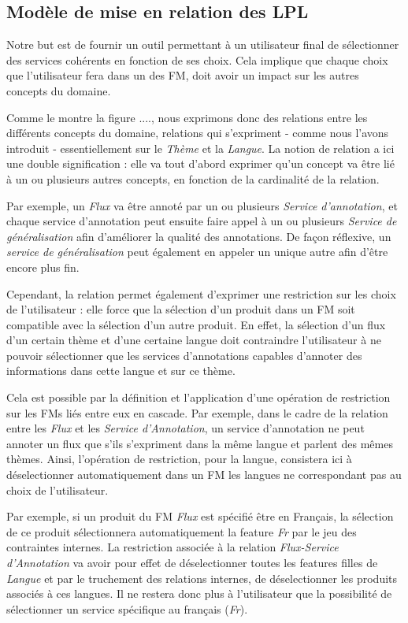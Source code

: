 \documentclass[]{easychair}
\begin{document}
\subsection{Modèle de mise en relation des LPL}
Notre but est de fournir un outil permettant à un utilisateur final de sélectionner des services cohérents en fonction de ses choix. Cela implique que chaque choix que l'utilisateur fera dans un des FM, doit avoir un impact sur les autres concepts du domaine. 

Comme le montre la figure ...., nous exprimons donc des relations entre les différents concepts du domaine, relations qui s'expriment - comme nous l'avons introduit - essentiellement sur le \textit{Thème} et la \textit{Langue}. La notion de relation a ici une double signification : elle va tout d'abord exprimer qu'un concept va être lié à un ou plusieurs autres concepts, en fonction de la cardinalité de la relation.

Par exemple, un \textit{Flux} va être annoté par un ou plusieurs \textit{Service d'annotation}, et chaque service d'annotation peut ensuite faire appel à un ou plusieurs \textit{Service de généralisation} afin d'améliorer la qualité des annotations. De façon réflexive, un \textit{service de généralisation} peut également en appeler un unique autre afin d'être encore plus fin.

Cependant, la relation permet également d'exprimer une restriction sur les choix de l'utilisateur : elle force que la sélection d'un produit dans un FM soit compatible avec la sélection d'un autre produit. En effet, la sélection d'un flux d'un certain thème et d'une certaine langue doit contraindre l'utilisateur à ne pouvoir sélectionner que les services d'annotations capables d'annoter des informations dans cette langue et sur ce thème. 

Cela est possible par la définition et l'application d'une opération de restriction sur les FMs liés entre eux en cascade. Par exemple, dans le cadre de la relation entre les \textit{Flux} et les \textit{Service d'Annotation}, un service d'annotation ne peut annoter un flux que s'ils s'expriment dans la même langue et parlent des mêmes thèmes. Ainsi, l'opération de restriction, pour la langue, consistera ici à déselectionner automatiquement dans un FM les langues ne correspondant pas au choix de l'utilisateur. 

Par exemple, si un produit du FM \textit{Flux} est spécifié être en Français, la sélection de ce produit sélectionnera automatiquement la feature \textit{Fr} par le jeu des contraintes internes. La restriction associée à la relation \textit{Flux-Service d'Annotation} va avoir pour effet de déselectionner toutes les features filles de \textit{Langue} et par le truchement des relations internes, de déselectionner les produits associés à ces langues. Il ne restera donc plus à l'utilisateur que la possibilité de sélectionner un service spécifique au français (\textit{Fr}).
\end{document}
